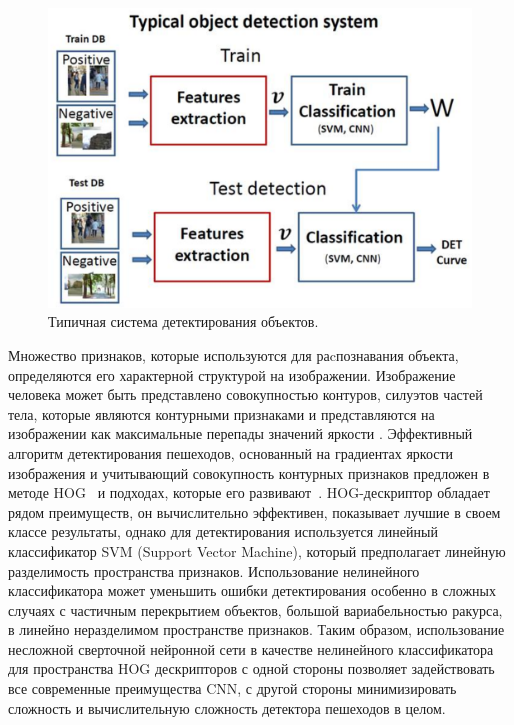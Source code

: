 \documentclass[12pt,twoside]{article}
\begin{document}
\begin{figure}[h]
	\includegraphics[width=\linewidth]{fig1}
	\caption{Типичная система детектирования объектов. }
	\label{fg:TypicalImg}
\end{figure}


Множество признаков, которые используются для раcпознавания объекта, определяются его характерной структурой на изображении. Изображение человека может быть представлено совокупностью контуров, силуэтов частей тела, которые являются контурными признаками и представляются на изображении как максимальные перепады значений яркости \cite{Gneushev03}. Эффективный алгоритм детектирования пешеходов, основанный на градиентах яркости изображения и учитывающий совокупность контурных признаков предложен в методе HOG~\cite{dalaltriggs2005} и подходах, которые его развивают~\cite{dpm, Samsonov17}. HOG-дескриптор обладает рядом преимуществ, он вычислительно
эффективен, показывает лучшие в своем классе результаты, однако для детектирования используется линейный классификатор SVM (Support Vector Machine), который предполагает линейную разделимость пространства признаков. Использование нелинейного классификатора может уменьшить ошибки детектирования особенно в сложных случаях с частичным перекрытием объектов, большой вариабельностью ракурса, в линейно неразделимом пространстве признаков. Таким образом, использование несложной сверточной нейронной сети в качестве нелинейного классификатора для пространства HOG дескрипторов с одной стороны позволяет задействовать все современные преимущества CNN, с другой стороны минимизировать сложность и вычислительную сложность детектора пешеходов в целом.
\end{document}
